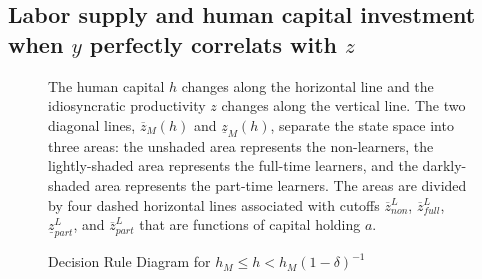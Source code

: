 \documentclass[12pt]{article}
\begin{document}

\subsection{Labor supply and human capital investment when $y$ perfectly correlats with $z$}\label{appendix:decision_rule_diagram}

\begin{figure}
    \centering
    

\caption{Decision Rule Diagram for $h_M \leq h<h_M(1-\delta)^{-1}$}
\begin{flushleft}
\footnotesize{The human capital $h$ changes along the horizontal line and the idiosyncratic productivity $z$ changes along the vertical line. The two diagonal lines, $\overline{z}_M(h)$ and $\underline{z}_M(h)$, separate the state space into three areas: the unshaded area represents the non-learners, the lightly-shaded area represents the full-time learners, and the darkly-shaded  area represents the part-time learners. The areas are divided by four dashed horizontal lines associated with cutoffs $\overline{z}^L_{non}$, $\overline{z}^L_{full}$, $\underline{z}^L_{part}$, and $\overline{z}^L_{part}$ that are functions of capital holding $a$.} 
\end{flushleft}
    
\label{fig:rule-diagram_yequalz}
\end{figure}
\end{document}
